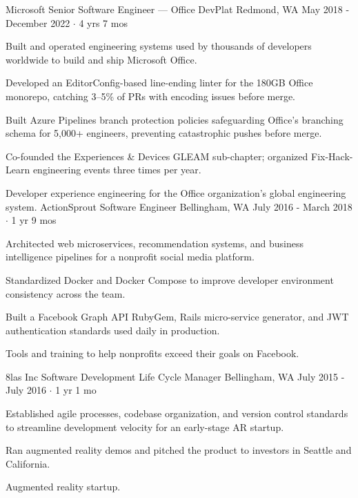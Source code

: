 \documentclass[11pt, a4paper]{awesome-cv}
\begin{document}
\begin{cventries}
  \cventry
    {Microsoft}
    {Senior Software Engineer — Office DevPlat}
    {Redmond, WA}
    {May 2018 - December 2022 $\cdot$ 4 yrs 7 mos}
    {
      \begin{cvitems}
        \item Built and operated engineering systems used by thousands of developers worldwide to build and ship Microsoft Office.
        \item Developed an EditorConfig-based line-ending linter for the 180GB Office monorepo, catching 3–5\% of PRs with encoding issues before merge.
        \item Built Azure Pipelines branch protection policies safeguarding Office's branching schema for 5,000+ engineers, preventing catastrophic pushes before merge.
        \item Co-founded the Experiences \& Devices GLEAM sub-chapter; organized Fix-Hack-Learn engineering events three times per year.
      \end{cvitems}
    }
    {Developer experience engineering for the Office organization's global engineering system.}
  \cventry
    {ActionSprout} %
    {Software Engineer} %
    {Bellingham, WA} %
    {July 2016 - March 2018 $\cdot$ 1 yr 9 mos} %
    {
      \begin{cvitems} %
        \item Architected web microservices, recommendation systems, and business intelligence pipelines for a nonprofit social media platform.
        \item Standardized Docker and Docker Compose to improve developer environment consistency across the team.
        \item Built a Facebook Graph API RubyGem, Rails micro-service generator, and JWT authentication standards used daily in production.
      \end{cvitems}
    }
    {Tools and training to help nonprofits exceed their goals on Facebook.}

  \cventry
    {8las Inc}
    {Software Development Life Cycle Manager}
    {Bellingham, WA}
    {July 2015 - July 2016 $\cdot$ 1 yr 1 mo}
    {
      \begin{cvitems}
        \item Established agile processes, codebase organization, and version control standards to streamline development velocity for an early-stage AR startup.
        \item Ran augmented reality demos and pitched the product to investors in Seattle and California.
      \end{cvitems}
    }
    {Augmented reality startup.}


\end{cventries}
\end{document}
